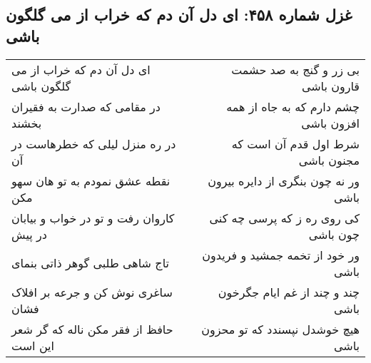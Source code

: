 \begin{center}
\section*{غزل شماره ۴۵۸: ای دل آن دم که خراب از می گلگون باشی}
\label{sec:sh458}
\begin{longtable}{l p{0.5cm} r}
ای دل آن دم که خراب از می گلگون باشی
&&
بی زر و گنج به صد حشمت قارون باشی
\\
در مقامی که صدارت به فقیران بخشند
&&
چشم دارم که به جاه از همه افزون باشی
\\
در ره منزل لیلی که خطرهاست در آن
&&
شرط اول قدم آن است که مجنون باشی
\\
نقطه عشق نمودم به تو هان سهو مکن
&&
ور نه چون بنگری از دایره بیرون باشی
\\
کاروان رفت و تو در خواب و بیابان در پیش
&&
کی روی ره ز که پرسی چه کنی چون باشی
\\
تاج شاهی طلبی گوهر ذاتی بنمای
&&
ور خود از تخمه جمشید و فریدون باشی
\\
ساغری نوش کن و جرعه بر افلاک فشان
&&
چند و چند از غم ایام جگرخون باشی
\\
حافظ از فقر مکن ناله که گر شعر این است
&&
هیچ خوشدل نپسندد که تو محزون باشی
\\
\end{longtable}
\end{center}
